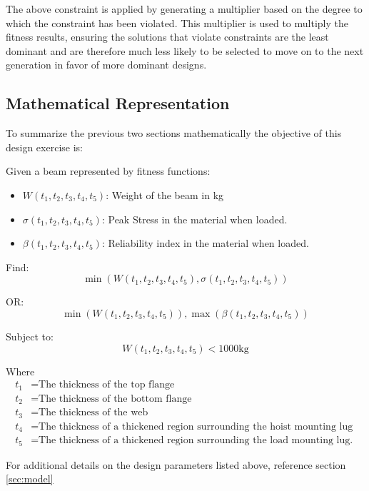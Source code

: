 The above constraint is applied by generating a multiplier based on the degree to which the constraint has been violated. This multiplier is used to multiply the fitness results, ensuring the solutions that violate constraints are the least dominant and are therefore much less likely to be selected to move on to the next generation in favor of more dominant designs.

\subsection{Mathematical Representation}
To summarize the previous two sections mathematically the objective of this design exercise is: 

Given a beam represented by fitness functions: 

\begin{itemize}
  \item $W(t_1, t_2, t_3, t_4, t_5)$: Weight of the beam in kg
  \item $\sigma(t_1, t_2, t_3, t_4, t_5)$: Peak Stress in the material when loaded. 
  \item $\beta(t_1, t_2, t_3, t_4, t_5)$: Reliability index in the material when loaded. 
\end{itemize}

Find: 
	$$\min\left(W(t_1, t_2, t_3, t_4, t_5), \sigma(t_1, t_2, t_3, t_4, t_5)\right)$$

OR: 
	$$\min\left(W(t_1, t_2, t_3, t_4, t_5)\right), \max\left(\beta(t_1, t_2, t_3, t_4, t_5)\right)$$

Subject to:
	$$W(t_1, t_2, t_3, t_4, t_5) < 1000 \text{kg}$$

Where
\begin{align*}
   t_1 &= \text{The thickness of the top flange}\\
   t_2 &= \text{The thickness of the bottom flange}\\
   t_3 &= \text{The thickness of the web}\\
   t_4 &= \text{The thickness of a thickened region surrounding the hoist mounting lug}\\
   t_5 &= \text{The thickness of a thickened region surrounding the load mounting lug. }
\end{align*}

For additional details on the design parameters listed above, reference section \ref{sec:model}

